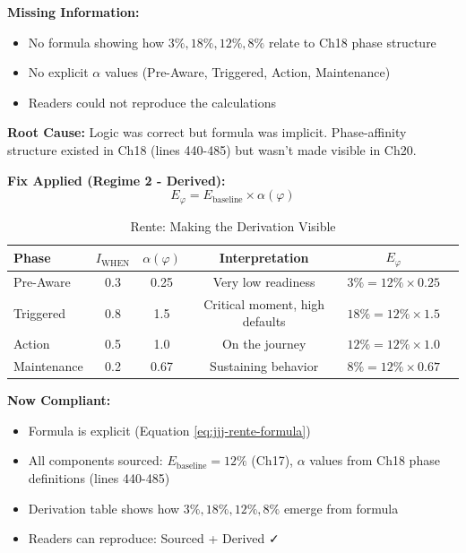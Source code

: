\textbf{Missing Information:}
\begin{itemize}[nosep]
\item No formula showing how $3\%, 18\%, 12\%, 8\%$ relate to Ch18 phase structure
\item No explicit $\alpha$ values (Pre-Aware, Triggered, Action, Maintenance)
\item Readers could not reproduce the calculations
\end{itemize}

\textbf{Root Cause:} Logic was correct but formula was implicit. Phase-affinity structure existed in Ch18 (lines 440-485) but wasn't made visible in Ch20.

\textbf{Fix Applied (Regime 2 - Derived):}
\begin{equation}
E_{\varphi} = E_{\text{baseline}} \times \alpha(\varphi)
\label{eq:jjj-rente-formula}
\end{equation}

\begin{table}[htbp]
\centering
\caption{Rente: Making the Derivation Visible}
\label{tab:jjj-rente-derivation}
\renewcommand{\arraystretch}{1.3}
\small
\begin{tabular}{@{}lccccc@{}}
\toprule
\textbf{Phase} & \textbf{$I_{\text{WHEN}}$} & \textbf{$\alpha(\varphi)$} & \textbf{Interpretation} & \textbf{$E_\varphi$} \\
\midrule
Pre-Aware & 0.3 & 0.25 & Very low readiness & $3\% = 12\% \times 0.25$ \\
Triggered & 0.8 & 1.5 & Critical moment, high defaults & $18\% = 12\% \times 1.5$ \\
Action & 0.5 & 1.0 & On the journey & $12\% = 12\% \times 1.0$ \\
Maintenance & 0.2 & 0.67 & Sustaining behavior & $8\% = 12\% \times 0.67$ \\
\bottomrule
\end{tabular}
\end{table}

\textbf{Now Compliant:}
\begin{itemize}[nosep]
\item Formula is explicit (Equation \eqref{eq:jjj-rente-formula})
\item All components sourced: $E_{\text{baseline}} = 12\%$ (Ch17), $\alpha$ values from Ch18 phase definitions (lines 440-485)
\item Derivation table shows how $3\%, 18\%, 12\%, 8\%$ emerge from formula
\item Readers can reproduce: Sourced + Derived ✓
\end{itemize}

